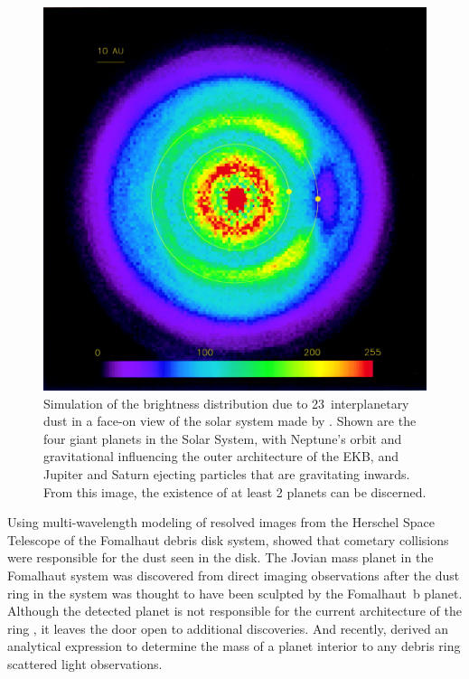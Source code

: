     \begin{figure}
    \centering
    \includegraphics[width=\textwidth]{Ch1/LiouZook_SS_99}
    \caption[Giant planets imprinted on solar system disk simulation]{Simulation of the brightness distribution due to 23\micron\ interplanetary dust in a face-on view of the solar system made by \citet{Liou1999}. Shown are the four giant planets in the Solar System, with Neptune's orbit and gravitational influencing the outer architecture of the EKB, and Jupiter and Saturn ejecting particles that are gravitating inwards. From this image, the existence of at least 2 planets can be discerned.}
    \label{fig:LiouZook_faceon}
    \end{figure}


    Using multi-wavelength modeling of resolved images from the Herschel Space Telescope of the Fomalhaut debris disk system, \citet{Acke2012} showed that cometary collisions were responsible for the dust seen in the disk. The Jovian mass planet in the Fomalhaut system \citep{Kalas2008} was discovered from direct imaging observations after the dust ring in the system was thought to have been sculpted by the Fomalhaut~b planet. Although the detected planet is not responsible for the current architecture of the ring \citep{Kalas2013}, it leaves the door open to additional discoveries. And recently, \citet{Rodigas2014} derived an analytical expression to determine the mass of a planet interior to any debris ring scattered light observations.
    
